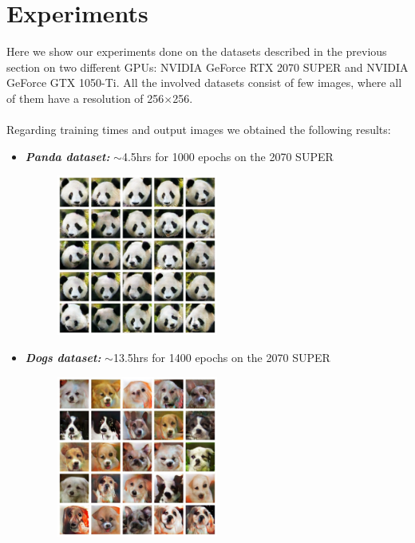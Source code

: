 \documentclass[12pt]{article}
\begin{document}

\section{Experiments}
\large
Here we show our experiments done on the datasets described in the previous section on two different
GPUs: NVIDIA GeForce RTX 2070 SUPER and NVIDIA GeForce GTX 1050-Ti. All the involved datasets consist 
of few images, where all of them have a resolution of 256$\times$256.\\\\
Regarding training times and output images we obtained the following results:
\begin{itemize}
	\item {			 
		\textbf{\textit{Panda dataset:}} $\sim$4.5hrs for 1000 epochs on the 2070 SUPER
		\begin{figure}[H]
			\centering
			\includegraphics[width=0.5\textwidth]{Images/panda_exp.jpg}
		\end{figure}
	}
	\item {
		\textbf{\textit{Dogs dataset:}} $\sim$13.5hrs for 1400 epochs on the 2070 SUPER
		\begin{figure}[H]
			\centering
			\includegraphics[width=0.5\textwidth]{Images/dogs_exp.jpg}

\end{figure}}
\end{itemize}
\end{document}
